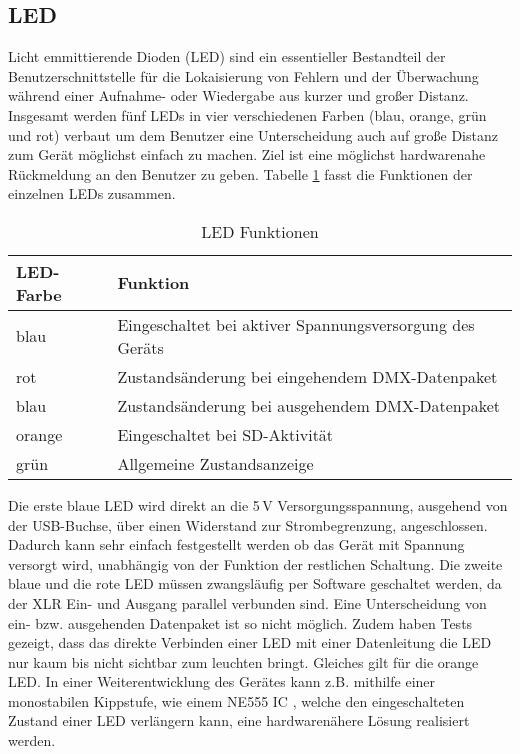 
\subsection{LED}

Licht emmittierende Dioden (LED) sind ein essentieller Bestandteil der Benutzerschnittstelle für die Lokaisierung von Fehlern und der Überwachung während einer Aufnahme- oder Wiedergabe aus kurzer und großer Distanz. Insgesamt werden fünf LEDs in vier verschiedenen Farben (blau, orange, grün und rot) verbaut um dem Benutzer eine Unterscheidung auch auf große Distanz zum Gerät möglichst einfach zu machen. Ziel ist eine möglichst hardwarenahe Rückmeldung an den Benutzer zu geben. Tabelle \ref{table:LED} fasst die Funktionen der einzelnen LEDs zusammen. 
\begin{table}[h]
	\begin{center}
		\begin{tabular}{l | l}
				\textbf{LED-Farbe} & \textbf{Funktion}\\
				\hline
				blau & Eingeschaltet bei aktiver Spannungsversorgung des Geräts\\
				rot & Zustandsänderung bei eingehendem DMX-Datenpaket\\
				blau & Zustandsänderung bei ausgehendem DMX-Datenpaket\\
				orange & Eingeschaltet bei SD-Aktivität\\
				grün & Allgemeine Zustandsanzeige
		\end{tabular}
		\caption{LED Funktionen}
		\label{table:LED}
	\end{center}
\end{table}
Die erste blaue LED wird direkt an die 5\,V Versorgungsspannung, ausgehend von der USB-Buchse, über einen Widerstand zur Strombegrenzung, angeschlossen. Dadurch kann sehr einfach festgestellt werden ob das Gerät mit Spannung versorgt wird, unabhängig von der Funktion der restlichen Schaltung. Die zweite blaue und die rote LED müssen zwangsläufig per Software geschaltet werden, da der XLR Ein- und Ausgang parallel verbunden sind. Eine Unterscheidung von ein- bzw. ausgehenden Datenpaket ist so nicht möglich. Zudem haben Tests gezeigt, dass das direkte Verbinden einer LED mit einer Datenleitung die LED nur kaum bis nicht sichtbar zum leuchten bringt. Gleiches gilt für die orange LED. In einer Weiterentwicklung des Gerätes kann z.B. mithilfe einer monostabilen Kippstufe, wie einem NE555 IC \cite{NE555}, welche den eingeschalteten Zustand einer LED verlängern kann, eine hardwarenähere Lösung realisiert werden.
